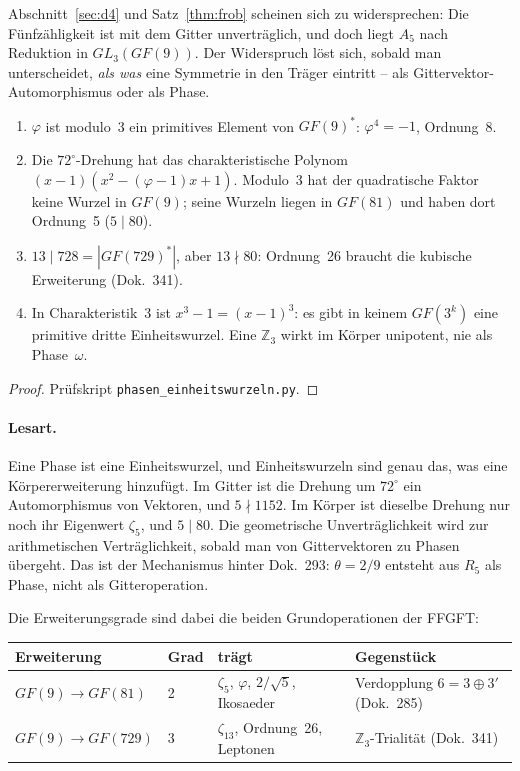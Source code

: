 Abschnitt~\ref{sec:d4} und Satz~\ref{thm:frob} scheinen sich zu
widersprechen: Die Fünfzähligkeit ist mit dem Gitter unverträglich, und
doch liegt $A_5$ nach Reduktion in $GL_3(GF(9))$. Der Widerspruch löst sich,
sobald man unterscheidet, \emph{als was} eine Symmetrie in den Träger
eintritt -- als Gittervektor-Automorphismus oder als Phase.

\begin{theorem}[Phasenkanal, \EM/\BM]\label{thm:phasen}
\begin{enumerate}[nosep]
\item $\varphi$ ist modulo~3 ein primitives Element von $GF(9)^*$:
      $\varphi^4=-1$, Ordnung~8.
\item Die $72^\circ$-Drehung hat das charakteristische Polynom
      $(x-1)(x^2-(\varphi-1)x+1)$. Modulo~3 hat der quadratische Faktor keine
      Wurzel in $GF(9)$; seine Wurzeln liegen in $GF(81)$ und haben dort
      Ordnung~5 ($5\mid80$).
\item $13\mid728=|GF(729)^*|$, aber $13\nmid80$: Ordnung~26 braucht die
      kubische Erweiterung (Dok.~341).
\item In Charakteristik~3 ist $x^3-1=(x-1)^3$: es gibt in keinem $GF(3^k)$
      eine primitive dritte Einheitswurzel. Eine $\mathbb{Z}_3$ wirkt im
      Körper unipotent, nie als Phase~$\omega$.
\end{enumerate}
\end{theorem}

\begin{proof}
Prüfskript \texttt{phasen\_einheitswurzeln.py}.
\end{proof}

\paragraph{Lesart.} Eine Phase ist eine Einheitswurzel, und Einheitswurzeln
sind genau das, was eine Körpererweiterung hinzufügt. Im Gitter ist die
Drehung um $72^\circ$ ein Automorphismus von Vektoren, und $5\nmid1152$.
Im Körper ist dieselbe Drehung nur noch ihr Eigenwert $\zeta_5$, und
$5\mid80$. Die geometrische Unverträglichkeit wird zur arithmetischen
Verträglichkeit, sobald man von Gittervektoren zu Phasen übergeht. Das ist
der Mechanismus hinter Dok.~293: $\theta=2/9$ entsteht aus $R_5$ als
Phase, nicht als Gitteroperation.

Die Erweiterungsgrade sind dabei die beiden Grundoperationen der FFGFT:
\begin{center}
\begin{tabular}{@{}llll@{}}
\toprule
Erweiterung & Grad & trägt & Gegenstück \\
\midrule
$GF(9)\to GF(81)$ & 2 & $\zeta_5$, $\varphi$, $2/\sqrt5$, Ikosaeder & Verdopplung $6=3\oplus3'$ (Dok.~285) \\
$GF(9)\to GF(729)$ & 3 & $\zeta_{13}$, Ordnung~26, Leptonen & $\mathbb{Z}_3$-Trialität (Dok.~341) \\
\bottomrule
\end{tabular}
\end{center}

